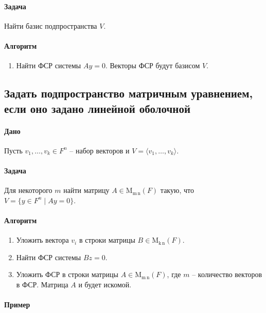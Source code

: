 \documentclass{article}
\newcommand{\MatrixDim}[3]{\operatorname{\mathrm{M}_{#2\,#3}}(#1)}
\begin{document}
\paragraph{Задача}

Найти базис подпространства $V$.

\paragraph{Алгоритм}

\begin{enumerate}
\item Найти ФСР системы $Ay = 0$.
Векторы ФСР будут базисом $V$.
\end{enumerate}

\subsection{Задать подпространство матричным уравнением, если оно задано линейной оболочной}

\paragraph{Дано}

Пусть $v_1,\ldots,v_k\in F^{n}$ -- набор векторов и $V = \langle v_1,\ldots,v_k \rangle$.

\paragraph{Задача}

Для некоторого $m$ найти матрицу $A\in\MatrixDim{F}{m}{n}$ такую, что $V = \{y\in F^{n}\mid Ay = 0\}$.

\paragraph{Алгоритм}

\begin{enumerate}
\item Уложить вектора $v_i$ в строки матрицы $B\in \MatrixDim{F}{k}{n}$.

\item Найти ФСР системы $Bz = 0$.

\item Уложить ФСР в строки матрицы $A\in \MatrixDim{F}{m}{n}$, где $m$ -- количество векторов в ФСР.
Матрица $A$ и будет искомой.
\end{enumerate}

\paragraph{Пример}
\end{document}
